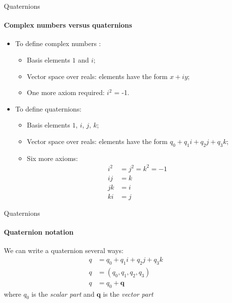 \documentclass[aspectratio=169]{beamer}
\begin{document}
\begin{frame}{Quaternions}
	\framesubtitle{Complex numbers versus quaternions}

    \begin{itemize}
    \item To define complex numbers  \cite{jeffcourse_2007}:
    \begin{itemize}
        \item Basis elements $1$ and $i$;
        \item Vector space over reals:  elements have the form $x+i y$;
        \item One more axiom required:  $i^2$ = -1.
    \end{itemize}
    \item To define quaternions:
    \begin{itemize}
        \item Basis elements $1$, $i$, $j$, $k$;
        \item Vector space over reals:  elements have the form $q_0 + q_1 i + q_2 j + q_3 k$;
        \item Six more axioms:
        \begin{align*}
        i^2 &= j^2 = k^2 = -1 \\
        ij &= k \\
        jk &= i \\
        ki &= j
        \end{align*}
    \end{itemize}
\end{itemize}
\end{frame}

\begin{frame}{Quaternions}
	\framesubtitle{Quaternion notation}

    We can write a quaternion several ways:
    \begin{align*}
        q &= q_0 + q_1 i + q_2 j + q_3 k\\
        q &= (q_0, q_1, q_2, q_3)\\
        q &= q_0 + \mathbf{q}
    \end{align*}
    where $q_0$ is the \emph{scalar part} and $\mathbf{q}$ is the \emph{vector part}
\end{frame}
\end{document}
